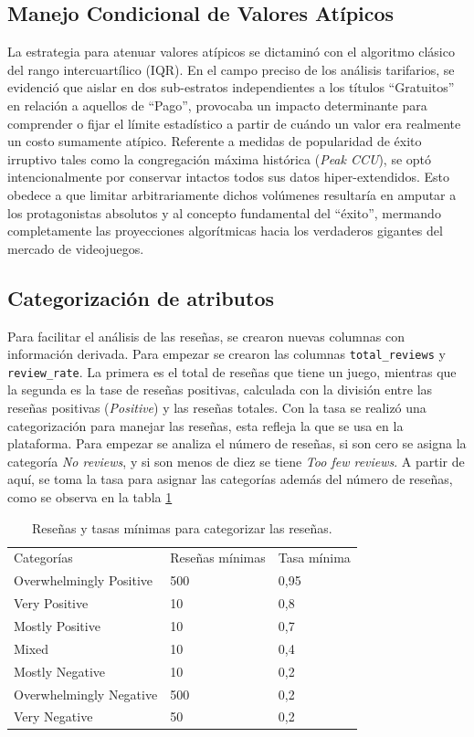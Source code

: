 \documentclass[conference]{IEEEtran}
\begin{document}
\subsection{Manejo Condicional de Valores Atípicos}
La estrategia para atenuar valores atípicos se dictaminó con el algoritmo clásico del rango intercuartílico (IQR). En el campo preciso de los análisis tarifarios, se evidenció que aislar en dos sub-estratos independientes a los títulos ``Gratuitos'' en relación a aquellos de ``Pago'', provocaba un impacto determinante para comprender o fijar el límite estadístico a partir de cuándo un valor era realmente un costo sumamente atípico. Referente a medidas de popularidad de éxito irruptivo tales como la congregación máxima histórica (\textit{Peak CCU}), se optó intencionalmente por conservar intactos todos sus datos hiper-extendidos. Esto obedece a que limitar arbitrariamente dichos volúmenes resultaría en amputar a los protagonistas absolutos y al concepto fundamental del ``éxito'', mermando completamente las proyecciones algorítmicas hacia los verdaderos gigantes del mercado de videojuegos.

\subsection{Categorización de atributos}
Para facilitar el análisis de las reseñas, se crearon nuevas columnas con información derivada. Para empezar se crearon las columnas \texttt{total\_reviews} y \texttt{review\_rate}. La primera es el total de reseñas que tiene un juego, mientras que la segunda es la tase de reseñas positivas, calculada con la división entre las reseñas positivas (\textit{Positive}) y las reseñas totales. Con la tasa se realizó una categorización para manejar las reseñas, esta refleja la que se usa en la plataforma. Para empezar se analiza el número de reseñas, si son cero se asigna la categoría \textit{No reviews}, y si son menos de diez se tiene \textit{Too few reviews}. A partir de aquí, se toma la tasa para asignar las categorías además del número de reseñas, como se observa en la tabla \ref{table_1}

\begin{table}[]
\begin{tabular}{lll}
Categorías              & Reseñas mínimas & Tasa mínima \\
Overwhelmingly Positive & 500             & 0,95        \\
Very Positive           & 10              & 0,8         \\
Mostly Positive         & 10              & 0,7         \\
Mixed                   & 10              & 0,4         \\
Mostly Negative         & 10              & 0,2         \\
Overwhelmingly Negative & 500             & 0,2         \\
Very Negative           & 50              & 0,2        
\end{tabular}
\caption{Reseñas y tasas mínimas para categorizar las reseñas.}
\label{table_1}
\end{table}
\end{document}
